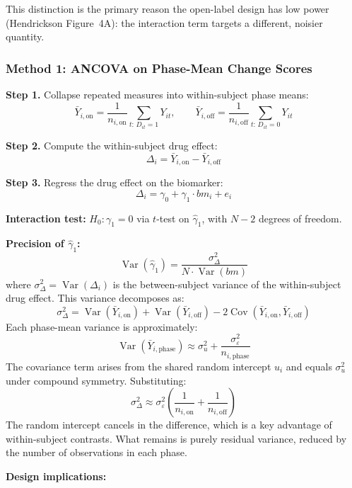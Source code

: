 \documentclass[11pt]{article}
\begin{document}
This distinction is the primary reason the open-label design has low
power (Hendrickson Figure~4A): the interaction term targets a different,
noisier quantity.

\subsubsection{Method 1: ANCOVA on Phase-Mean Change Scores}

\textbf{Step 1.} Collapse repeated measures into within-subject phase
means:
\[
\bar{Y}_{i,\text{on}} = \frac{1}{n_{i,\text{on}}}
\sum_{t:\, D_{it}=1} Y_{it}, \qquad
\bar{Y}_{i,\text{off}} = \frac{1}{n_{i,\text{off}}}
\sum_{t:\, D_{it}=0} Y_{it}
\]

\textbf{Step 2.} Compute the within-subject drug effect:
\[
\Delta_i = \bar{Y}_{i,\text{on}} - \bar{Y}_{i,\text{off}}
\]

\textbf{Step 3.} Regress the drug effect on the biomarker:
\[
\Delta_i = \gamma_0 + \gamma_1 \cdot bm_i + e_i
\]

\textbf{Interaction test:} $H_0: \gamma_1 = 0$ via $t$-test on
$\hat{\gamma}_1$, with $N - 2$ degrees of freedom.

\textbf{Precision of $\hat{\gamma}_1$:}
\[
\operatorname{Var}(\hat{\gamma}_1) =
\frac{\sigma^2_\Delta}{N \cdot \operatorname{Var}(bm)}
\]
where $\sigma^2_\Delta = \operatorname{Var}(\Delta_i)$ is the
between-subject variance of the within-subject drug effect. This
variance decomposes as:
\[
\sigma^2_\Delta = \operatorname{Var}(\bar{Y}_{i,\text{on}}) +
\operatorname{Var}(\bar{Y}_{i,\text{off}}) -
2\operatorname{Cov}(\bar{Y}_{i,\text{on}},\bar{Y}_{i,\text{off}})
\]
Each phase-mean variance is approximately:
\[
\operatorname{Var}(\bar{Y}_{i,\text{phase}}) \approx
\sigma^2_u + \frac{\sigma^2_\varepsilon}{n_{i,\text{phase}}}
\]
The covariance term arises from the shared random intercept $u_i$ and
equals $\sigma^2_u$ under compound symmetry. Substituting:
\[
\sigma^2_\Delta \approx
\sigma^2_\varepsilon \!\left(
\frac{1}{n_{i,\text{on}}} + \frac{1}{n_{i,\text{off}}}
\right)
\]
The random intercept cancels in the difference, which is a key advantage
of within-subject contrasts. What remains is purely residual variance,
reduced by the number of observations in each phase.

\textbf{Design implications:}
\end{document}

